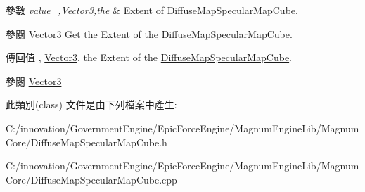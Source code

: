 \begin{DoxyParams}{參數}
{\em value\+\_\+,\hyperlink{class_i_dream_sky_1_1_vector3}{Vector3},the} & Extent of \hyperlink{class_i_dream_sky_1_1_diffuse_map_specular_map_cube}{Diffuse\+Map\+Specular\+Map\+Cube}. \\
\hline
\end{DoxyParams}
\begin{DoxySeeAlso}{參閱}
\hyperlink{class_i_dream_sky_1_1_vector3}{Vector3} Get the Extent of the \hyperlink{class_i_dream_sky_1_1_diffuse_map_specular_map_cube}{Diffuse\+Map\+Specular\+Map\+Cube}. 
\end{DoxySeeAlso}
\begin{DoxyReturn}{傳回值}
, \hyperlink{class_i_dream_sky_1_1_vector3}{Vector3}, the Extent of the \hyperlink{class_i_dream_sky_1_1_diffuse_map_specular_map_cube}{Diffuse\+Map\+Specular\+Map\+Cube}. 
\end{DoxyReturn}
\begin{DoxySeeAlso}{參閱}
\hyperlink{class_i_dream_sky_1_1_vector3}{Vector3} 
\end{DoxySeeAlso}


此類別(class) 文件是由下列檔案中產生\+:\begin{DoxyCompactItemize}
\item 
C\+:/innovation/\+Government\+Engine/\+Epic\+Force\+Engine/\+Magnum\+Engine\+Lib/\+Magnum\+Core/Diffuse\+Map\+Specular\+Map\+Cube.\+h\item 
C\+:/innovation/\+Government\+Engine/\+Epic\+Force\+Engine/\+Magnum\+Engine\+Lib/\+Magnum\+Core/Diffuse\+Map\+Specular\+Map\+Cube.\+cpp\end{DoxyCompactItemize}
